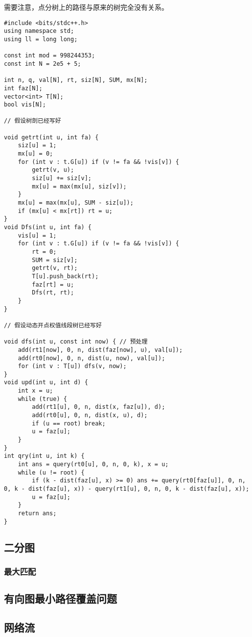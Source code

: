 \documentclass[a4paper]{article}
\begin{document}
需要注意，点分树上的路径与原来的树完全没有关系。

\begin{lstlisting}
#include <bits/stdc++.h>
using namespace std;
using ll = long long;

const int mod = 998244353;
const int N = 2e5 + 5;

int n, q, val[N], rt, siz[N], SUM, mx[N];
int faz[N];
vector<int> T[N];
bool vis[N];

// 假设树剖已经写好

void getrt(int u, int fa) {
	siz[u] = 1;
	mx[u] = 0;
	for (int v : t.G[u]) if (v != fa && !vis[v]) {
		getrt(v, u);
		siz[u] += siz[v];
		mx[u] = max(mx[u], siz[v]);
	}
	mx[u] = max(mx[u], SUM - siz[u]);
	if (mx[u] < mx[rt]) rt = u;
}
void Dfs(int u, int fa) {
	vis[u] = 1;
	for (int v : t.G[u]) if (v != fa && !vis[v]) {
		rt = 0;
		SUM = siz[v];
		getrt(v, rt);
		T[u].push_back(rt);
		faz[rt] = u;
		Dfs(rt, rt);
	}
}

// 假设动态开点权值线段树已经写好

void dfs(int u, const int now) { // 预处理
	add(rt1[now], 0, n, dist(faz[now], u), val[u]);
	add(rt0[now], 0, n, dist(u, now), val[u]);
	for (int v : T[u]) dfs(v, now);
}
void upd(int u, int d) {
	int x = u;
	while (true) {
		add(rt1[u], 0, n, dist(x, faz[u]), d);
		add(rt0[u], 0, n, dist(x, u), d);
		if (u == root) break;
		u = faz[u];
	}
}
int qry(int u, int k) {
	int ans = query(rt0[u], 0, n, 0, k), x = u;
	while (u != root) {
		if (k - dist(faz[u], x) >= 0) ans += query(rt0[faz[u]], 0, n, 0, k - dist(faz[u], x)) - query(rt1[u], 0, n, 0, k - dist(faz[u], x));
		u = faz[u];
	}
	return ans;
}
\end{lstlisting}

\subsection{二分图}
\subsubsection*{最大匹配}


\subsection{有向图最小路径覆盖问题}


\subsection{网络流}
\end{document}
